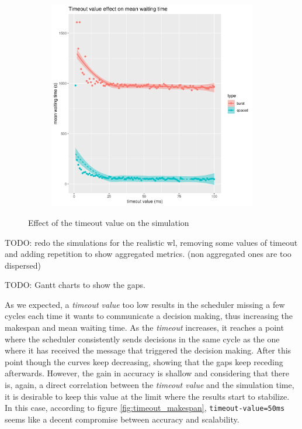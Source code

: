 \begin{figure}
	\centering
	\begin{subfigure}{.5\textwidth}
		\centering
		\includegraphics[width=\linewidth]{imgs/timeout_mwt.png}
		\caption{}
		\label{fig:timeout_mwt}
	\end{subfigure}
	\caption{Effect of the timeout value on the simulation}
	\label{fig:timeout}
\end{figure}

TODO: redo the simulations for the realistic wl, removing some values of
timeout and adding repetition to show aggregated metrics. (non aggregated ones
are too dispersed)

TODO: Gantt charts to show the gaps.

As we expected, a \textit{timeout value} too low results in the scheduler
missing a few cycles each time it wants to communicate a decision making, thus
increasing the makespan and mean waiting time.  As the \textit{timeout}
increases, it reaches a point where the scheduler consistently sends decisions
in the same cycle as the one where it has received the message that triggered
the decision making. After this point though the curves keep decreasing,
showing that the gaps keep receding afterwards. However, the gain in accuracy
is shallow and considering that there is, again, a direct correlation between
the \textit{timeout value} and the simulation time, it is desirable to keep
this value at the limit where the results start to stabilize.  In this case,
according to figure \ref{fig:timeout_makespan}, \texttt{timeout-value=50ms}
seems like a decent compromise between accuracy and scalability.

